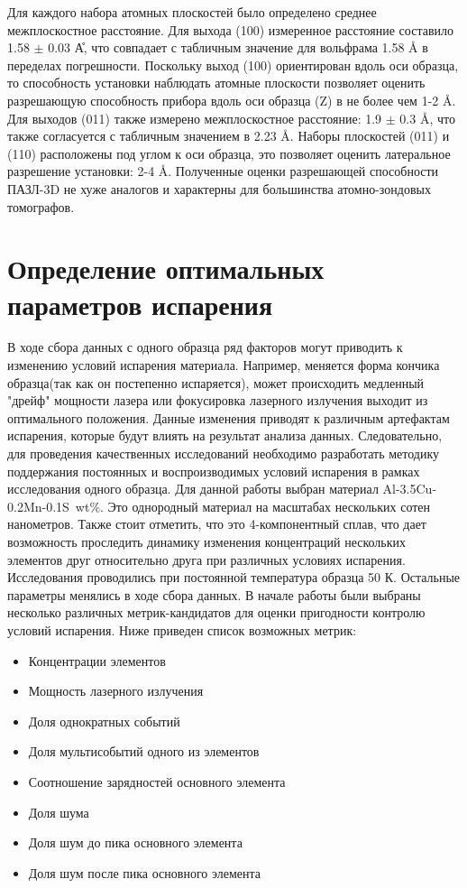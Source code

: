 Для каждого набора атомных плоскостей было определено среднее межплоскостное расстояние. Для выхода (100) измеренное расстояние составило 1.58 $\pm$ 0.03 \r{А}, что совпадает с табличным значение для вольфрама 1.58 \r{A} в переделах погрешности. Поскольку выход (100) ориентирован вдоль оси образца, то способность установки наблюдать атомные плоскости позволяет оценить разрешающую способность прибора вдоль оси образца (Z) в не более чем 1-2 \r{A}. Для выходов (011) также измерено межплоскостное расстояние: 1.9 $\pm$ 0.3 \r{A}, что также согласуется с табличным значением в 2.23 \r{A}. Наборы плоскостей (011) и (110) расположены под углом к оси образца, это позволяет оценить латеральное разрешение установки: 2-4 \r{A}. Полученные оценки разрешающей способности ПАЗЛ-3D не хуже аналогов и характерны для большинства атомно-зондовых томографов. 

\FloatBarrier

\section{Определение оптимальных параметров испарения}\label{sec:ch3/sect3}

В ходе сбора данных с одного образца ряд факторов могут приводить к изменению условий испарения материала. Например, меняется форма кончика образца(так как он постепенно испаряется), может происходить медленный "дрейф" мощности лазера или фокусировка лазерного излучения выходит из оптимального положения. Данные изменения приводят к различным артефактам испарения, которые будут влиять на результат анализа данных. Следовательно, для проведения качественных исследований необходимо разработать методику поддержания постоянных и воспроизводимых условий испарения в рамках исследования одного образца.
Для данной работы выбран материал Al-3.5Cu-0.2Mn-0.1S~wt\%. Это однородный материал на масштабах нескольких сотен нанометров. Также стоит отметить, что это 4-компонентный сплав, что дает возможность проследить динамику изменения концентраций нескольких элементов друг относительно друга при различных условиях испарения.
Исследования проводились при постоянной температура образца 50 К. Остальные параметры менялись в ходе сбора данных. В начале работы были выбраны несколько различных метрик-кандидатов для оценки пригодности контролю условий испарения. Ниже приведен список возможных метрик:

\begin{itemize}
	\item Концентрации элементов
	\item Мощность лазерного излучения	
	\item Доля однократных событий
	\item Доля мультисобытий одного из элементов
	\item Соотношение зарядностей основного элемента
	\item Доля шума
	\item Доля шум до пика основного элемента
	\item Доля шум после пика основного элемента			
\end{itemize}

